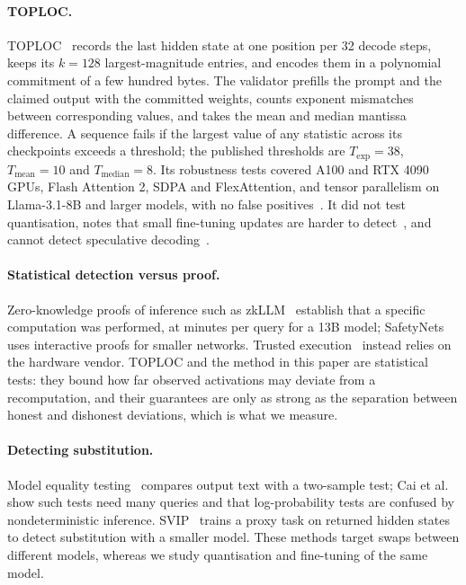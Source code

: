 \documentclass[10pt,twocolumn]{article}
\begin{document}
\paragraph{TOPLOC.}
TOPLOC~\cite{ong2025toploc} records the last hidden state at one position per 32 decode steps, keeps its $k{=}128$ largest-magnitude entries, and encodes them in a polynomial commitment of a few hundred bytes.
The validator prefills the prompt and the claimed output with the committed weights, counts exponent mismatches between corresponding values, and takes the mean and median mantissa difference.
A sequence fails if the largest value of any statistic across its checkpoints exceeds a threshold; the published thresholds are $T_{\exp}{=}38$, $T_{\text{mean}}{=}10$ and $T_{\text{median}}{=}8$.
Its robustness tests covered A100 and RTX 4090 GPUs, Flash Attention 2, SDPA and FlexAttention, and tensor parallelism on Llama-3.1-8B and larger models, with no false positives~\cite[\S5.6, Table~2]{ong2025toploc}.
It did not test quantisation, notes that small fine-tuning updates are harder to detect~\cite[\S6.5]{ong2025toploc}, and cannot detect speculative decoding~\cite[\S6.2]{ong2025toploc}.

\paragraph{Statistical detection versus proof.}
Zero-knowledge proofs of inference such as zkLLM~\cite{sun2024zkllm} establish that a specific computation was performed, at minutes per query for a 13B model; SafetyNets~\cite{ghodsi2017safetynets} uses interactive proofs for smaller networks.
Trusted execution~\cite{tramer2019slalom,cai2025auditing} instead relies on the hardware vendor.
TOPLOC and the method in this paper are statistical tests: they bound how far observed activations may deviate from a recomputation, and their guarantees are only as strong as the separation between honest and dishonest deviations, which is what we measure.

\paragraph{Detecting substitution.}
Model equality testing~\cite{gao2025model} compares output text with a two-sample test; Cai et al.~\cite{cai2025auditing} show such tests need many queries and that log-probability tests are confused by nondeterministic inference.
SVIP~\cite{sun2025svip} trains a proxy task on returned hidden states to detect substitution with a smaller model.
These methods target swaps between different models, whereas we study quantisation and fine-tuning of the same model.
\end{document}
